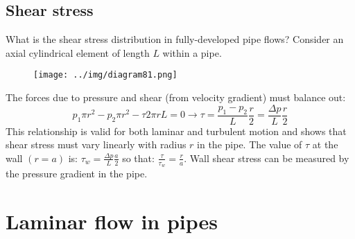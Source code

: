\documentclass[class=report, crop=false, 12pt,a4paper]{standalone}
\begin{document}
\subsection{Shear stress}
What is the shear stress distribution in fully-developed pipe flows? Consider an axial cylindrical element of length $L$ within a pipe.
\begin{figure}[H]
  \centering
  \texttt{[image: ../img/diagram81.png]}
  \caption{}
\end{figure}
The forces due to pressure and shear (from velocity gradient) must balance out:
\begin{equation}
  p_1 \pi r^2 - p_2 \pi r^2 - \tau 2 \pi r L = 0 \rightarrow \tau = \frac{p_1 - p_2}{L} \frac{r}{2} = \frac{\Delta p}{L} \frac{r}{2} 
\end{equation}
This relationship is valid for both laminar and turbulent motion and shows that shear stress must vary linearly with radius $r$ in the pipe. The value of $\tau$ at the wall $\left( r = a \right)$ is: $\tau_w = \frac{\Delta p}{L} \frac{a}{2}$ so that: $\frac{\tau}{\tau_w} = \frac{r}{a}$. Wall shear stress can be measured by the pressure gradient in the pipe.
\section{Laminar flow in pipes}
\end{document}
